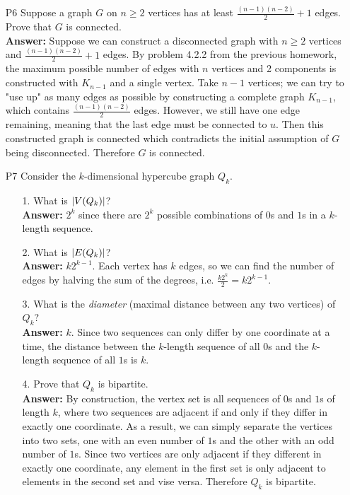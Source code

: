 \documentclass{article}
\begin{document}
\begin{itemize}
    \item [P6] Suppose a graph $G$ on $n\geq 2$ vertices has at least $\frac{(n-1)(n-2)}{2}+1$ edges. Prove that $G$ is connected.\\
          \textbf{Answer:} Suppose we can construct a disconnected graph with $n\geq 2$ vertices and $\frac{(n-1)(n-2)}{2}+1$ edges. By problem 4.2.2 from the previous homework, the maximum possible number of edges with $n$ vertices and 2 components is constructed with $K_{n-1}$ and a single vertex. Take $n-1$ vertices; we can try to "use up" as many edges as possible by constructing a complete graph $K_{n-1}$, which contains $\frac{(n-1)(n-2)}{2}$ edges. However, we still have one edge remaining, meaning that the last edge must be connected to $u$. Then this constructed graph is connected which contradicts the initial assumption of $G$ being disconnected. Therefore $G$ is connected.
    \item [P7] Consider the $k$-dimensional hypercube graph $Q_k$.\begin{itemize}
              \item [1.] What is $\abs{V(Q_k)}$?\\
                    \textbf{Answer:} $2^k$ since there are $2^k$ possible combinations of $0$s and $1$s in a $k$-length sequence.
              \item [2.] What is $\abs{E(Q_k)}$?\\
                    \textbf{Answer:} $k2^{k-1}$. Each vertex has $k$ edges, so we can find the number of edges by halving the sum of the degrees, i.e. $\frac{k2^k}{2}=k2^{k-1}$.
              \item [3.] What is the \textit{diameter} (maximal distance between any two vertices) of $Q_k$?\\
                    \textbf{Answer:} $k$. Since two sequences can only differ by one coordinate at a time, the distance between the $k$-length sequence of all $0$s and the $k$-length sequence of all $1$s is $k$.
              \item [4.] Prove that $Q_k$ is bipartite.\\
                    \textbf{Answer:} By construction, the vertex set is all sequences of $0$s and $1$s of length $k$, where two sequences are adjacent if and only if they differ in exactly one coordinate. As a result, we can simply separate the vertices into two sets, one with an even number of $1$s and the other with an odd number of $1$s. Since two vertices are only adjacent if they different in exactly one coordinate, any element in the first set is only adjacent to elements in the second set and vise versa. Therefore $Q_k$ is bipartite.
          \end{itemize}
\end{itemize}
\end{document}

